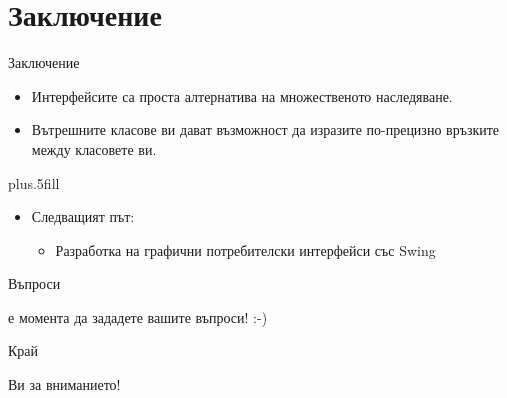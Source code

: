 \documentclass{beamer}
\begin{document}
\section*{Заключение}
\begin{frame}{Заключение}
  \transdissolve
  \begin{itemize}
  \item
    Интерфейсите са проста алтернатива на множественото наследяване.
  \item
    Вътрешните класове ви дават възможност да изразите по-прецизно
    връзките между класовете ви.
  \end{itemize}
  
  \vskip0pt plus.5fill
  \begin{itemize}
  \item
    Следващият път:
    \begin{itemize}
    \item
      Разработка на графични потребителски интерфейси със Swing
    \end{itemize}
  \end{itemize}
\end{frame}

\begin{frame}{Въпроси}
  \transdissolve
  \begin{center}
     е момента да зададете вашите въпроси! :-)
  \end{center}
\end{frame}

\begin{frame}{Край}
  \transdissolve
  \begin{center}
     Ви за вниманието!
  \end{center}
\end{frame}
\end{document}
